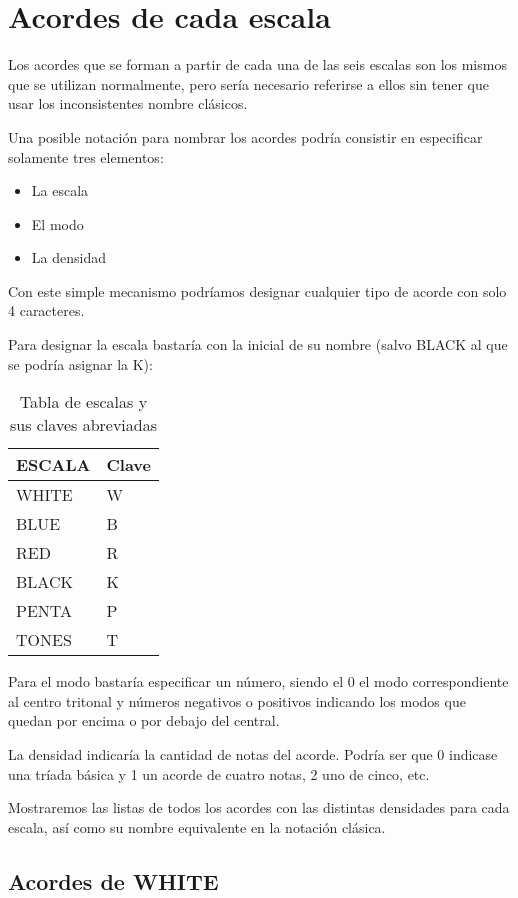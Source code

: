 \documentclass[]{article}
\begin{document}
\section{Acordes de cada escala}

Los acordes que se forman a partir de cada una de las seis escalas son los mismos que se utilizan normalmente, pero sería necesario referirse a ellos sin tener que usar los inconsistentes nombre clásicos. 

Una posible notación para nombrar los acordes podría consistir en especificar solamente tres elementos:
\begin{itemize}
  \item La escala
  \item El modo
  \item La densidad
\end{itemize}
Con este simple mecanismo podríamos designar cualquier tipo de acorde con solo 4 caracteres.

Para designar la escala bastaría con la inicial de su nombre (salvo \textsf{BLACK} al que se podría asignar la \textsf{K}):
\begin{table}[H]
  \centering
  \begin{tabular}{ll}
    \toprule
    ESCALA & Clave \\
    \midrule
    \textsf{WHITE} & W \\
    \textsf{BLUE}  & B \\
    \textsf{RED}   & R \\
    \textsf{BLACK} & K \\
    \textsf{PENTA} & P \\
    \textsf{TONES} & T \\
    \bottomrule
  \end{tabular}
  \caption{Tabla de escalas y sus claves abreviadas}\label{tab:scales-and-keys}
\end{table}

Para el modo bastaría especificar un número, siendo el 0 el modo correspondiente al centro tritonal y números negativos o positivos indicando los modos que quedan por encima o por debajo del central. 

La densidad indicaría la cantidad de notas del acorde. Podría ser que 0 indicase una tríada básica y 1 un acorde de cuatro notas, 2 uno de cinco, etc.

Mostraremos las listas de todos los acordes con las distintas densidades para cada escala, así como su nombre equivalente en la notación clásica.
\subsection*{Acordes de WHITE}
\end{document}
